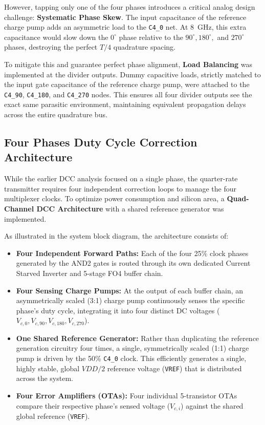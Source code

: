 However, tapping only one of the four phases introduces a critical analog design challenge: \textbf{Systematic Phase Skew}. The input capacitance of the reference charge pump adds an asymmetric load to the \texttt{C4\_0} net. At 8~GHz, this extra capacitance would slow down the $0^\circ$ phase relative to the $90^\circ, 180^\circ,$ and $270^\circ$ phases, destroying the perfect $T/4$ quadrature spacing. 

To mitigate this and guarantee perfect phase alignment, \textbf{Load Balancing} was implemented at the divider outputs. Dummy capacitive loads, strictly matched to the input gate capacitance of the reference charge pump, were attached to the \texttt{C4\_90}, \texttt{C4\_180}, and \texttt{C4\_270} nodes. This ensures all four divider outputs see the exact same parasitic environment, maintaining equivalent propagation delays across the entire quadrature bus.

\subsection{Four Phases Duty Cycle Correction Architecture}

While the earlier DCC analysis focused on a single phase, the quarter-rate transmitter requires four independent correction loops to manage the four multiplexer clocks. To optimize power consumption and silicon area, a \textbf{Quad-Channel DCC Architecture} with a shared reference generator was implemented.

As illustrated in the system block diagram, the architecture consists of:
\begin{itemize}
    \item \textbf{Four Independent Forward Paths:} Each of the four 25\% clock phases generated by the AND2 gates is routed through its own dedicated Current Starved Inverter and 5-stage FO4 buffer chain.
    \item \textbf{Four Sensing Charge Pumps:} At the output of each buffer chain, an asymmetrically scaled (3:1) charge pump continuously senses the specific phase's duty cycle, integrating it into four distinct DC voltages ($V_{c,0}, V_{c,90}, V_{c,180}, V_{c,270}$).
    \item \textbf{One Shared Reference Generator:} Rather than duplicating the reference generation circuitry four times, a single, symmetrically scaled (1:1) charge pump is driven by the 50\% \texttt{C4\_0} clock. This efficiently generates a single, highly stable, global $VDD/2$ reference voltage (\texttt{VREF}) that is distributed across the system.
    \item \textbf{Four Error Amplifiers (OTAs):} Four individual 5-transistor OTAs compare their respective phase's sensed voltage ($V_{c,i}$) against the shared global reference (\texttt{VREF}). 
\end{itemize}

